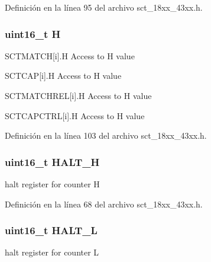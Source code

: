 Definición en la línea 95 del archivo sct\+\_\+18xx\+\_\+43xx.\+h.

\subsubsection[{\texorpdfstring{H}{H}}]{\setlength{\rightskip}{0pt plus 5cm}uint16\+\_\+t H}\hypertarget{struct_l_p_c___s_c_t___t_a38e1d5c4c9e43fb6422619272bff5838}{}\label{struct_l_p_c___s_c_t___t_a38e1d5c4c9e43fb6422619272bff5838}
S\+C\+T\+M\+A\+T\+CH\mbox{[}i\mbox{]}.H Access to H value

S\+C\+T\+C\+AP\mbox{[}i\mbox{]}.H Access to H value

S\+C\+T\+M\+A\+T\+C\+H\+R\+EL\mbox{[}i\mbox{]}.H Access to H value

S\+C\+T\+C\+A\+P\+C\+T\+RL\mbox{[}i\mbox{]}.H Access to H value 

Definición en la línea 103 del archivo sct\+\_\+18xx\+\_\+43xx.\+h.

\subsubsection[{\texorpdfstring{H\+A\+L\+T\+\_\+H}{HALT_H}}]{ uint16\+\_\+t H\+A\+L\+T\+\_\+H}\hypertarget{struct_l_p_c___s_c_t___t_a04c1cfb929777a2a6edfb84a2ff19b51}{}\label{struct_l_p_c___s_c_t___t_a04c1cfb929777a2a6edfb84a2ff19b51}
halt register for counter H 

Definición en la línea 68 del archivo sct\+\_\+18xx\+\_\+43xx.\+h.

\subsubsection[{\texorpdfstring{H\+A\+L\+T\+\_\+L}{HALT_L}}]{ uint16\+\_\+t H\+A\+L\+T\+\_\+L}\hypertarget{struct_l_p_c___s_c_t___t_a9415c068da58b948df1e3ef847af21eb}{}\label{struct_l_p_c___s_c_t___t_a9415c068da58b948df1e3ef847af21eb}
halt register for counter L 


